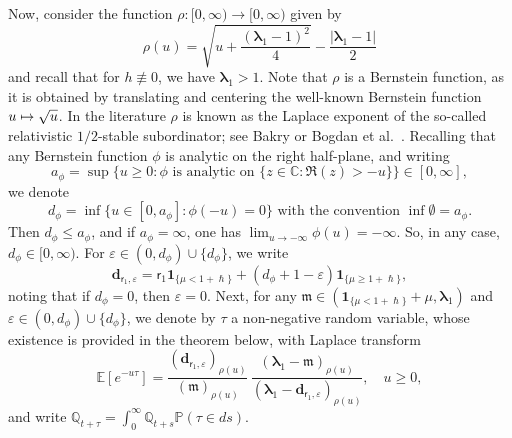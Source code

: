 \documentclass[JEP,XML,SOM,Unicode]{cedram}
\let\epsilon\varepsilon
\newcommand\mto{\mathchoice{\longmapsto}{\mapsto}{\mapsto}{\mapsto}}
\theoremstyle{plain}
\theoremstyle{definition}
\newcommand{\E}{\mathbb{E}}
\newcommand{\Prob}{\mathbb{P}}
\newcommand{\J}{\mathds{Q}}
\newcommand{\m}{\mathfrak{m}}
\newcommand{\dpt}{\bm{d}_{\vat,\epsilon}}
\newcommand{\dph}{(d_\phi+1-\epsilon)}
\newcommand{\lam}{{\bm{\lambda}_1}}
\newcommand{\vat}{{\mathsf{r}_1}}
\let\h\hslash
\let\mo\mu
\begin{document}
Now, consider the function $\rho:[0,\infty) \to [0,\infty)$ given by
\begin{equation*}
\rho(u) = \sqrt{u+\frac{(\lam-1)^2}{4}}-\frac{\left|\lam-1\right|}{2}
\end{equation*}
and recall that for $h \not\equiv 0$, we have $\lam > 1$. Note that $\rho$ is a Bernstein function, as it is obtained by translating and centering the well-known Bernstein function $u \mto \sqrt{u}$. In the literature $\rho$ is known as the Laplace exponent of the so-called relativistic $1/2$-stable subordinator; see Bakry \cite{Bakry-relativistic} or Bogdan et al.~\cite{Potential2009}. Recalling that any Bernstein function $\phi$ is analytic on the right half-plane, and writing
\[
a_\phi=\sup\bigl\{u \ge 0 : \phi \textrm{ is analytic on } \{z \in \mathbb C : \Re(z)>-u\}\bigr\} \in [0,\infty],
\]
we denote
\begin{equation}
\label{eq:dphi}
d_{\phi} = \inf\{u \in [0,a_\phi] : \phi(-u)=0 \} \mbox{ with the convention }\inf \emptyset = a_{\phi}.
\end{equation}
Then $d_{\phi} \le a_{\phi}$, and if $a_{\phi} = \infty$, one has $\lim_{u \to - \infty} \phi(u) = - \infty$.
So, in any case, $d_{\phi} \in [0, \infty)$. For $\epsilon \in (0,d_\phi) \cup \{d_\phi\}$, we write
\begin{equation}
\label{eq:def-dtheta}
\dpt = \vat \bm{1}_{\{ \mo < 1+\h \}}+ \dph\bm{1}_{\{ \mo \geq 1+\h \}},
\end{equation}
noting that if $d_\phi=0$, then $\epsilon = 0$. Next, for any $\m \in (\bm{1}_{\{\mo < 1+\h\}} + \mo , \lam)$ and $\epsilon \in (0,d_\phi) \cup \{d_\phi\}$, we denote by $\tau$ a non-negative random variable, whose existence is provided in the theorem below, with Laplace transform
\begin{equation}
\label{eq:def-T-Laplace}
\E\left[e^{-u \tau}\right] = \frac{(\dpt)_{\rho(u)}}{(\m)_{\rho(u)}}\, \frac{(\lam-\m)_{\rho(u)}}{(\lam-\dpt)_{\rho(u)}} , \quad u \geq 0,
\end{equation}
and write $\J_{t+\tau} = \int_0^\infty \J_{t+s} \Prob(\tau \in ds)$.
\end{document}
